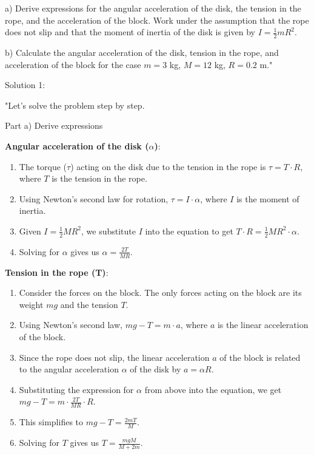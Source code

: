 a) Derive expressions for the angular acceleration of the disk, the tension in the rope, and the acceleration of the block. Work under the assumption that the rope does not slip and that the moment of inertia of the disk is given by \( I = \frac{1}{2} m R^{2} \).
    
b) Calculate the angular acceleration of the disk, tension in the rope, and acceleration of the block for the case \( m = 3 \) kg, \( M = 12 \) kg, \( R = 0.2 \) m."

Solution 1:

"Let's solve the problem step by step.

Part a) Derive expressions

\textbf{Angular acceleration of the disk (\( \alpha \))}:
\begin{enumerate}
    \item The torque (\( \tau \)) acting on the disk due to the tension in the rope is \( \tau = T \cdot R \), where \( T \) is the tension in the rope.
    \item Using Newton's second law for rotation, \( \tau = I \cdot \alpha \), where \( I \) is the moment of inertia.
    \item Given \( I = \frac{1}{2} M R^2 \), we substitute \( I \) into the equation to get \( T \cdot R = \frac{1}{2} M R^2 \cdot \alpha \).
    \item Solving for \( \alpha \) gives us \( \alpha = \frac{2T}{M R} \).
\end{enumerate}

\textbf{Tension in the rope (T)}:
\begin{enumerate}
    \item Consider the forces on the block. The only forces acting on the block are its weight \( mg \) and the tension \( T \).
    \item Using Newton's second law, \( mg - T = m \cdot a \), where \( a \) is the linear acceleration of the block.
    \item Since the rope does not slip, the linear acceleration \( a \) of the block is related to the angular acceleration \( \alpha \) of the disk by \( a = \alpha R \).
    \item Substituting the expression for \( \alpha \) from above into the equation, we get \( mg - T = m \cdot \frac{2T}{M R} \cdot R \).
    \item This simplifies to \( mg - T = \frac{2mT}{M} \).
    \item Solving for \( T \) gives us \( T = \frac{mgM}{M + 2m} \).
\end{enumerate}

